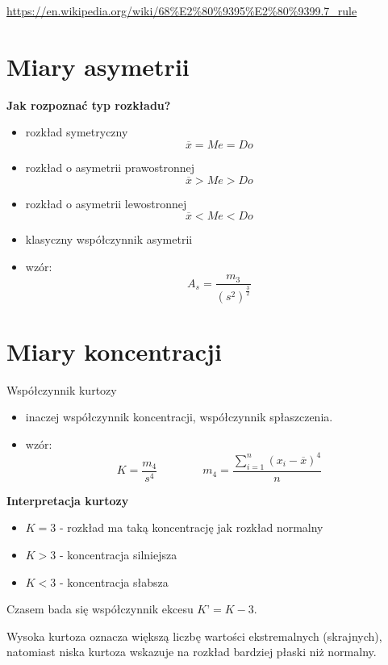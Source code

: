 \documentclass[
  polish,
  letterpaper,
  DIV=11,
  numbers=noendperiod]{scrreprt}
\providecommand{\tightlist}{%
  \setlength{\itemsep}{0pt}\setlength{\parskip}{0pt}}
\begin{document}
\url{https://en.wikipedia.org/wiki/68\%E2\%80\%9395\%E2\%80\%9399.7_rule}

\section{Miary asymetrii}\label{miary-asymetrii}

\textbf{Jak rozpoznać typ rozkładu?}

\begin{itemize}
\item
  rozkład symetryczny \[\overline{x} =Me=Do\]
\item
  rozkład o asymetrii prawostronnej \[\overline{x} >Me>Do\]
\item
  rozkład o asymetrii lewostronnej \[\overline{x}<Me<Do\]
\item
  klasyczny współczynnik asymetrii
\item
  wzór: \[A_s=\frac{m_3}{(s^2)^{\frac{3}{2}}}\]
\end{itemize}

\section{Miary koncentracji}\label{miary-koncentracji}

Współczynnik kurtozy

\begin{itemize}
\tightlist
\item
  inaczej współczynnik koncentracji, współczynnik spłaszczenia.
\item
  wzór:
  \[K=\frac{m_4}{s^4} \qquad \qquad m_4=\frac{\sum\limits_{i=1}^n (x_i-\overline{x})^4}{n}\]
\end{itemize}

\textbf{Interpretacja kurtozy}

\begin{itemize}
\tightlist
\item
  \(K=3\) - rozkład ma taką koncentrację jak rozkład normalny
\item
  \(K>3\) - koncentracja silniejsza
\item
  \(K<3\) - koncentracja słabsza
\end{itemize}

Czasem bada się współczynnik ekcesu \(K’=K-3\).

Wysoka kurtoza oznacza większą liczbę wartości ekstremalnych
(skrajnych), natomiast niska kurtoza wskazuje na rozkład bardziej płaski
niż normalny.
\end{document}
